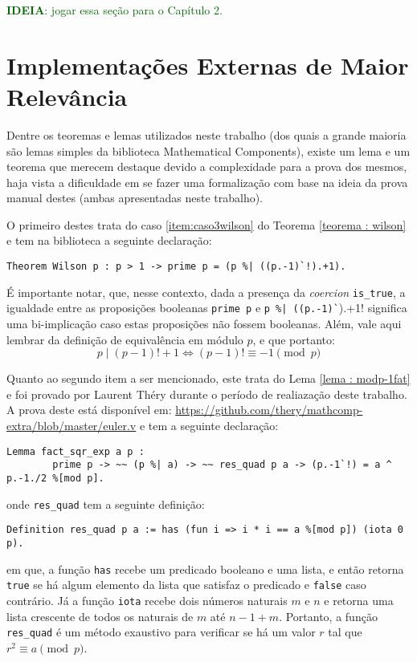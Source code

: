 \textcolor{darkgreen}{\textbf{IDEIA}: jogar essa seção para o Capítulo 2.}

\section{Implementações Externas de Maior Relevância}
Dentre os teoremas e lemas utilizados neste trabalho (dos quais a grande maioria são lemas simples da biblioteca Mathematical Components), existe um lema e um teorema que merecem destaque devido a complexidade para a prova dos mesmos, haja vista a dificuldade em se fazer uma formalização com base na ideia da prova manual destes (ambas apresentadas neste trabalho).

O primeiro destes trata do caso \ref{item:caso3wilson} do Teorema \ref{teorema : wilson} e tem na biblioteca a seguinte declaração:
\begin{lstlisting}[language=coq]
        Theorem Wilson p : p > 1 -> prime p = (p %| ((p.-1)`!).+1).
\end{lstlisting}
É importante notar, que, nesse contexto, dada a presença da \textit{coercion} \lstinline[language=coq]!is_true!, a igualdade entre as proposições booleanas \lstinline[language=coq]!prime p! e \lstinline[language=coq]!p %| ((p.-1)`!).+1! significa uma bi-implicação caso estas proposições não fossem booleanas. Além, vale aqui lembrar da definição de equivalência em módulo $p$, e que portanto:
\begin{equation}
        p \mid (p-1)! + 1 \Longleftrightarrow (p-1)! \equiv -1 \pmod{p} 
\end{equation}

Quanto ao segundo item a ser mencionado, este trata do Lema \ref{lema : modp-1fat} e foi provado por Laurent Théry durante o período de realiazação deste trabalho. A prova deste está disponível em: \hyperlink{https://github.com/thery/mathcomp-extra/blob/master/euler.v}{https://github.com/thery/mathcomp-extra/blob/master/euler.v} e tem a seguinte declaração:
\begin{lstlisting}[language=coq]
        Lemma fact_sqr_exp a p :
        prime p -> ~~ (p %| a) -> ~~ res_quad p a -> (p.-1`!) = a ^ p.-1./2 %[mod p].
\end{lstlisting}
onde \lstinline[language=coq]!res_quad! tem a seguinte definição:
\begin{lstlisting}[language=coq]
        Definition res_quad p a := has (fun i => i * i == a %[mod p]) (iota 0 p).
\end{lstlisting}
em que, a função \lstinline[language=coq]!has! recebe um predicado booleano e uma lista, e então retorna \lstinline[language=coq]!true!
se há algum elemento da lista que satisfaz o predicado e \lstinline[language=coq]!false! caso contrário. Já a função \lstinline[language=coq]!iota! recebe dois números naturais $m$ e $n$ e retorna uma lista crescente de todos os naturais de $m$ até $n-1+m$. Portanto, a função \lstinline[language=coq]!res_quad! é um método exaustivo para verificar se há um valor $r$ tal que $r^{2} \equiv a \pmod{p}$.

